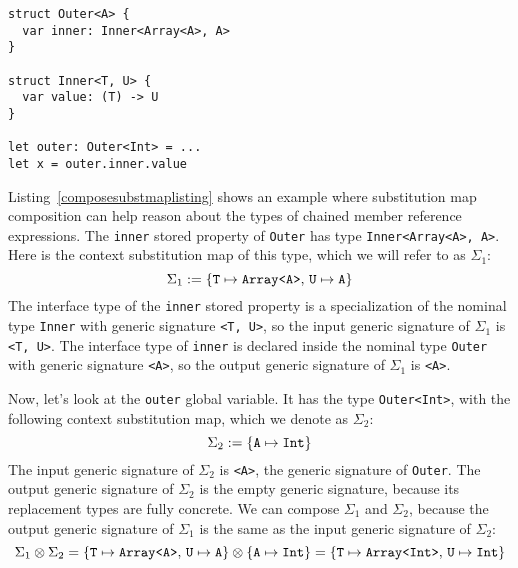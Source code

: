 \documentclass[../generics]{subfiles}
\begin{document}
\begin{listing}\label{composesubstmaplisting}
\begin{Verbatim}
struct Outer<A> {
  var inner: Inner<Array<A>, A>
}

struct Inner<T, U> {
  var value: (T) -> U
}

let outer: Outer<Int> = ...
let x = outer.inner.value
\end{Verbatim}
\end{listing}
\begin{example}\label{composesubstmapexample}
Listing~\ref{composesubstmaplisting} shows an example where substitution map composition can help reason about the types of chained member reference expressions. The \texttt{inner} stored property of \texttt{Outer} has type \texttt{Inner<Array<A>, A>}. Here is the context substitution map of this type, which we will refer to as $\Sigma_1$:
\[
\Sigma_1 := \{ \texttt{T} \mapsto \texttt{Array<A>},\,\texttt{U} \mapsto \texttt{A} \}
\]
The interface type of the \texttt{inner} stored property is a specialization of the nominal type \texttt{Inner} with generic signature \texttt{<T, U>}, so the input generic signature of $\Sigma_1$ is \texttt{<T, U>}. The interface type of \texttt{inner} is declared inside the nominal type \texttt{Outer} with generic signature \texttt{<A>}, so the output generic signature of $\Sigma_1$ is \texttt{<A>}.

Now, let's look at the \texttt{outer} global variable. It has the type \texttt{Outer<Int>}, with the following context substitution map, which we denote as $\Sigma_2$:
\[
\Sigma_2 := \{ \texttt{A} \mapsto \texttt{Int} \}
\]
The input generic signature of $\Sigma_2$ is \texttt{<A>}, the generic signature of \texttt{Outer}. The output generic signature of $\Sigma_2$ is the empty generic signature, because its replacement types are fully concrete. We can compose $\Sigma_1$ and $\Sigma_2$, because the output generic signature of $\Sigma_1$ is the same as the input generic signature of $\Sigma_2$:
\[\Sigma_1\otimes\Sigma_2 = \{ \texttt{T} \mapsto \texttt{Array<A>},\,\texttt{U} \mapsto \texttt{A} \}\otimes\{ \texttt{A} \mapsto \texttt{Int} \} = \{ \texttt{T} \mapsto \texttt{Array<Int>},\,\texttt{U} \mapsto \texttt{Int} \}\]


\end{example}
\end{document}
